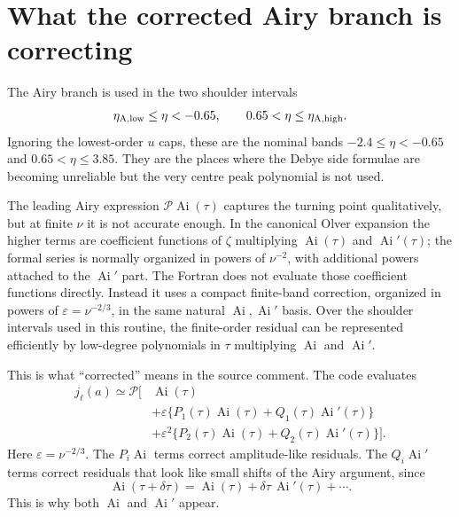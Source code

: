 \documentclass[11pt,a4paper]{article}
\newcommand{\Ai}{\operatorname{Ai}}
\newcommand{\Aip}{\operatorname{Ai}'}
\newcommand{\eps}{\varepsilon}
\begin{document}
\section{What the corrected Airy branch is correcting}

The Airy branch is used in the two shoulder intervals
\begin{equation}
  \eta_{\rm A,low}\le\eta<-0.65,
  \qquad
  0.65<\eta\le\eta_{\rm A,high}.
\end{equation}
Ignoring the lowest-order $u$ caps, these are the nominal bands $-2.4\le\eta<-0.65$ and $0.65<\eta\le3.85$.  They are the places where the Debye side formulae are becoming unreliable but the very centre peak polynomial is not used.

The leading Airy expression $\mathcal{P}\Ai(\tau)$ captures the turning point qualitatively, but at finite $\nu$ it is not accurate enough.  In the canonical Olver expansion the higher terms are coefficient functions of $\zeta$ multiplying $\Ai(\tau)$ and $\Ai'(\tau)$; the formal series is normally organized in powers of $\nu^{-2}$, with additional powers attached to the $\Ai'$ part.  The Fortran does not evaluate those coefficient functions directly.  Instead it uses a compact finite-band correction, organized in powers of $\eps=\nu^{-2/3}$, in the same natural $\Ai,\Ai'$ basis.  Over the shoulder intervals used in this routine, the finite-order residual can be represented efficiently by low-degree polynomials in $\tau$ multiplying $\Ai$ and $\Ai'$.

This is what ``corrected'' means in the source comment.  The code evaluates
\begin{equation}
\begin{split}
  j_\ell(a) \simeq \mathcal{P}\big[&\Ai(\tau) \\
  &+\eps\{P_1(\tau)\Ai(\tau)+Q_1(\tau)\Aip(\tau)\} \\
  &+\eps^2\{P_2(\tau)\Ai(\tau)+Q_2(\tau)\Aip(\tau)\}\big].
\end{split}
\label{eq:corrected-airy}
\end{equation}
Here $\eps=\nu^{-2/3}$.  The $P_i\Ai$ terms correct amplitude-like residuals.  The $Q_i\Ai'$ terms correct residuals that look like small shifts of the Airy argument, since
\begin{equation}
  \Ai(\tau+\delta\tau)=\Ai(\tau)+\delta\tau\,\Ai'(\tau)+\cdots .
\end{equation}
This is why both $\Ai$ and $\Ai'$ appear.
\end{document}
